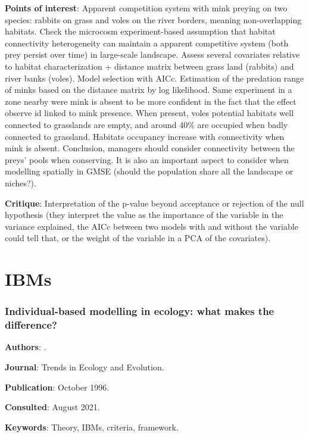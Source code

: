 \documentclass[12pt,a4paper]{article}
\begin{document}
\textbf{Points of interest}: Apparent competition system with mink preying on two species: rabbits on grass and voles on the river borders, meaning non-overlapping habitats. Check the microcosm experiment-based assumption that habitat connectivity heterogeneity can maintain a apparent competitive system (both prey persist over time) in large-scale landscape. Assess several covariates relative to habitat characterization + distance matrix between grass land (rabbits) and river banks (voles). Model selection with AICc. Estimation of the predation range of minks based on the distance matrix by log likelihood. Same experiment in a zone nearby were mink is absent to be more confident in the fact that the effect observe id linked to mink presence. When present, voles potential habitats well connected to grasslands are empty, and around 40\% are occupied when badly connected to grassland. Habitats occupancy increase with connectivity when mink is absent. Conclusion, managers should consider connectivity between the preys' pools when conserving. It is also an important aspect to consider when modelling spatially in GMSE (should the population share all the landscape or niches?).

\textbf{Critique}: Interpretation of the p-value beyond acceptance or rejection of the null hypothesis (they interpret the value as the importance of the variable in the variance explained, the AICc between two models with and without the variable could tell that, or the weight of the variable in a PCA of the covariates).

\newpage

\section*{IBMs}

\subsubsection*{Individual-based modelling in ecology: what makes the difference?}

\textbf{Authors}: \cite{uchmanski1996ibm}.

\textbf{Journal}: Trends in Ecology and Evolution.

\textbf{Publication}: October 1996.

\textbf{Consulted}: August 2021.

\textbf{Keywords}: Theory, IBMs, criteria, framework.
\end{document}
